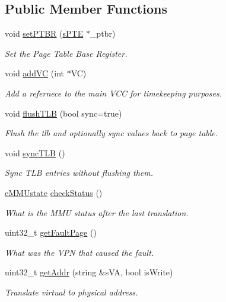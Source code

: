 \subsection*{\-Public \-Member \-Functions}
\begin{DoxyCompactItemize}
\item 
void \hyperlink{classcMMU_a1fadf507689a62a0a28ea10734bdfcca}{set\-P\-T\-B\-R} (\hyperlink{structsPTE}{s\-P\-T\-E} $\ast$\-\_\-ptbr)
\begin{DoxyCompactList}\small\item\em \-Set the \-Page \-Table \-Base \-Register. \end{DoxyCompactList}\item 
\hypertarget{classcMMU_a043b4dce463c5379e1885a5918103286}{void \hyperlink{classcMMU_a043b4dce463c5379e1885a5918103286}{add\-V\-C} (int $\ast$\-V\-C)}\label{df/deb/classcMMU_a043b4dce463c5379e1885a5918103286}

\begin{DoxyCompactList}\small\item\em \-Add a refernece to the main \-V\-C\-C for timekeeping purposes. \end{DoxyCompactList}\item 
void \hyperlink{classcMMU_ad46f9d2c75a2fac3b0b7154e864345ab}{flush\-T\-L\-B} (bool sync=true)
\begin{DoxyCompactList}\small\item\em \-Flush the tlb and optionally sync values back to page table. \end{DoxyCompactList}\item 
void \hyperlink{classcMMU_ae981abbf574849c2d83c2402212c3d24}{sync\-T\-L\-B} ()
\begin{DoxyCompactList}\small\item\em \-Sync \-T\-L\-B entries without flushing them. \end{DoxyCompactList}\item 
\hyperlink{mmu_8h_ae08a7145dbbab15abf6cd31e4958d861}{e\-M\-M\-Ustate} \hyperlink{classcMMU_ac0b382b3495595d8b4784835c9d73515}{check\-Status} ()
\begin{DoxyCompactList}\small\item\em \-What is the \-M\-M\-U status after the last translation. \end{DoxyCompactList}\item 
uint32\-\_\-t \hyperlink{classcMMU_ab906b5a3693545e3d7fbdab5d1b3a397}{get\-Fault\-Page} ()
\begin{DoxyCompactList}\small\item\em \-What was the \-V\-P\-N that caused the fault. \end{DoxyCompactList}\item 
uint32\-\_\-t \hyperlink{classcMMU_a8f67a55d3444b1164999ef64253eb37e}{get\-Addr} (string \&s\-V\-A, bool is\-Write)
\begin{DoxyCompactList}\small\item\em \-Translate virtual to physical address. \end{DoxyCompactList}\end{DoxyCompactItemize}
